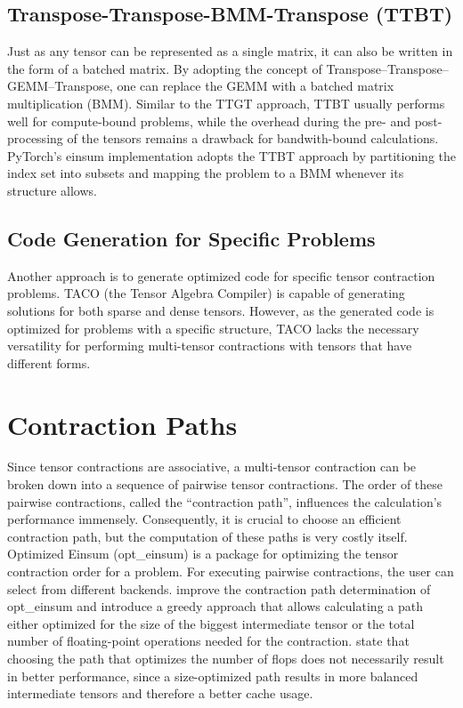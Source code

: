 \subsection{Transpose-Transpose-BMM-Transpose (TTBT)}
Just as any tensor can be represented as a single matrix, it can also be written in the form of a batched matrix.
By adopting the concept of Transpose–Transpose–GEMM–Transpose, one can replace the GEMM with a batched matrix multiplication (BMM). Similar to the TTGT approach, TTBT usually performs well for compute-bound problems, while the overhead during the pre- and post-processing of the tensors remains a drawback for bandwith-bound calculations.\\
PyTorch’s einsum implementation \cite{PyTorch} adopts the TTBT approach by partitioning the index set into subsets and mapping the problem to a BMM whenever its structure allows.

\subsection{Code Generation for Specific Problems}
Another approach is to generate optimized code for specific tensor contraction problems. TACO (the Tensor Algebra Compiler) \cite{kjolstad2017taco} is capable of generating solutions for both sparse and dense tensors. However, as the generated code is optimized for problems with a specific structure, TACO lacks the necessary versatility for performing multi-tensor contractions with tensors that have different forms.

\section{Contraction Paths}
Since tensor contractions are associative, a multi-tensor contraction can be broken down into a sequence of pairwise tensor contractions. The order of these pairwise contractions, called the ``contraction path'', influences the calculation's performance immensely. Consequently, it is crucial to choose an efficient contraction path, but the computation of these paths is very costly itself. 
Optimized Einsum (opt\_einsum) \cite{opteinsum} 
is a package for optimizing the tensor contraction order for a problem. For executing pairwise contractions, the user can select from different backends. \textcite{cgreedy} improve the contraction path determination of opt\_einsum and introduce a greedy approach that allows calculating a path either optimized for the size of the biggest intermediate tensor or the total number of floating-point operations needed for the contraction. \textcite{blacher2024einsum} state that choosing the path that optimizes the number of flops does not necessarily result in better performance, since a size-optimized path results in more balanced intermediate tensors and therefore a better cache usage. 
